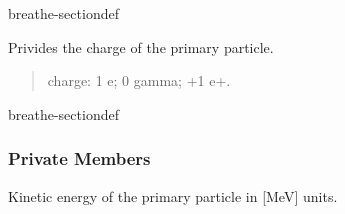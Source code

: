 \documentclass[letterpaper,10pt,english]{sphinxmanual}
\begin{document}
\begin{fulllineitems}
\begin{sphinxuseclass}{breathe-sectiondef}
\begin{fulllineitems}
\end{fulllineitems}


\begin{fulllineitems}
\label{\detokenize{Simulation/SimulationCodeDoc:_CPPv4NK16PrimaryGenerator9GetChargeEv}}
\pysigstartsignatures
\pysigstartmultiline
{}
\pysigstopmultiline
\pysigstopsignatures
\sphinxAtStartPar
Privides the charge of the primary particle. 

\sphinxAtStartPar
\begin{quote}\begin{description}
\sphinxAtStartPar
charge: \sphinxhyphen{}1 e\sphinxhyphen{}; 0 gamma; +1 e+. 

\end{description}\end{quote}


\end{fulllineitems}


\end{sphinxuseclass}
\begin{sphinxuseclass}{breathe-sectiondef}\subsubsection*{Private Members}

\begin{fulllineitems}
\label{\detokenize{Simulation/SimulationCodeDoc:_CPPv4N16PrimaryGenerator10fKinEnergyE}}
\pysigstartsignatures
\pysigstartmultiline
{}
\pysigstopmultiline
\pysigstopsignatures
\sphinxAtStartPar
Kinetic energy of the primary particle in {[}MeV{]} units. 

\end{fulllineitems}


\end{sphinxuseclass}
\end{fulllineitems}
\end{document}
